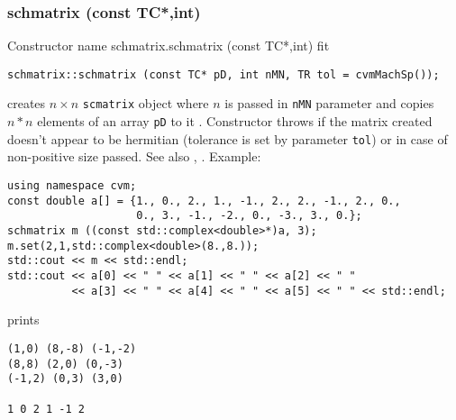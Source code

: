 \subsubsection{schmatrix (const TC*,int)}
Constructor%
\pdfdest name {schmatrix.schmatrix (const TC*,int)} fit
\begin{verbatim}
schmatrix::schmatrix (const TC* pD, int nMN, TR tol = cvmMachSp());
\end{verbatim}
creates  $n\times n$ \verb"scmatrix" object where $n$ is passed in
\verb"nMN" parameter
and copies $n*n$ elements of an array  \verb"pD" to it .
Constructor throws  
if the matrix created doesn't appear to be hermitian (tolerance is set by
parameter \verb'tol') or in case of non-positive size passed. 
See also ,
.
Example:
\begin{Verbatim}
using namespace cvm;
const double a[] = {1., 0., 2., 1., -1., 2., 2., -1., 2., 0.,
                    0., 3., -1., -2., 0., -3., 3., 0.};
schmatrix m ((const std::complex<double>*)a, 3);
m.set(2,1,std::complex<double>(8.,8.));
std::cout << m << std::endl;
std::cout << a[0] << " " << a[1] << " " << a[2] << " "
          << a[3] << " " << a[4] << " " << a[5] << " " << std::endl;
\end{Verbatim}
prints
\begin{Verbatim}
(1,0) (8,-8) (-1,-2)
(8,8) (2,0) (0,-3)
(-1,2) (0,3) (3,0)

1 0 2 1 -1 2
\end{Verbatim}
\newpage



